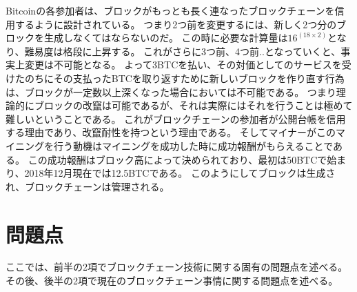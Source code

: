 Bitcoinの各参加者は、ブロックがもっとも長く連なったブロックチェーンを信用するように設計されている。
つまり2つ前を変更するには、新しく2つ分のブロックを生成しなくてはならないのだ。
この時に必要な計算量は\(16^(18\times2) \)となり、難易度は格段に上昇する。
これがさらに3つ前、4つ前..となっていくと、事実上変更は不可能となる。
よって3BTCを払い、その対価としてのサービスを受けたのちにその支払ったBTCを取り返すために新しいブロックを作り直す行為は、ブロックが一定数以上深くなった場合においては不可能である。
つまり理論的にブロックの改竄は可能であるが、それは実際にはそれを行うことは極めて難しいということである。
これがブロックチェーンの参加者が公開台帳を信用する理由であり、改竄耐性を持つという理由である。
そしてマイナーがこのマイニングを行う動機はマイニングを成功した時に成功報酬がもらえることである。
この成功報酬はブロック高によって決められており、最初は50BTCで始まり、2018年12月現在では12.5BTCである。
このようにしてブロックは生成され、ブロックチェーンは管理される。

\section{問題点}
ここでは、前半の2項でブロックチェーン技術に関する固有の問題点を述べる。
その後、後半の2項で現在のブロックチェーン事情に関する問題点を述べる。

